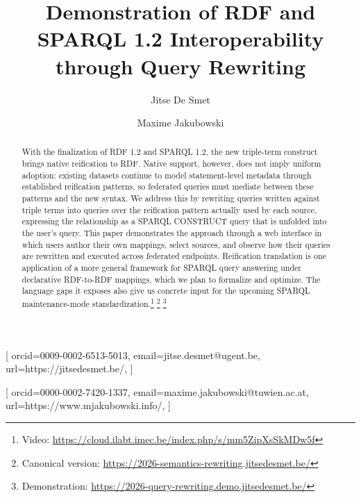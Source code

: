 \documentclass[
]{ceurart}
\begin{document}


\title{Demonstration of RDF and SPARQL 1.2 Interoperability through
  Query Rewriting}

\author[1]{Jitse De Smet}[%
orcid=0009-0002-6513-5013,
email=jitse.desmet@ugent.be,
url=https://jitsedesmet.be/,
]
\author[2]{Maxime Jakubowski}[%
orcid=0000-0002-7420-1337,
email=maxime.jakubowski@tuwien.ac.at,
url=https://www.mjakubowski.info/,
]
\address[1]{IDLab, Department of Electronics and Information Systems,
  Ghent University -- imec, Belgium}
\address[2]{TU Wien, Austria}

\begin{abstract}
  With the finalization of RDF 1.2 and SPARQL 1.2, the new triple-term
  construct brings native reification to RDF. Native support, however,
  does not imply uniform adoption: existing datasets continue to model
  statement-level metadata through established reification patterns,
  so federated queries must mediate between these patterns and the new
  syntax. We address this by rewriting queries written against triple
  terms into queries over the reification pattern actually used by
  each source, expressing the relationship as a SPARQL CONSTRUCT query
  that is unfolded into the user's query. This paper demonstrates the
  approach through a web interface in which users author their own
  mappings, select sources, and observe how their queries are
  rewritten and executed across federated endpoints.
  Reification translation is one application of a more general
  framework for SPARQL query answering under declarative RDF-to-RDF
  mappings, which we plan to formalize and optimize. The language gaps
  it exposes also give us concrete input for the upcoming SPARQL
  maintenance-mode standardization.\footnote{Video:
    \url{https://cloud.ilabt.imec.be/index.php/s/mm5ZipXsSkMDw5f}}
  \footnote{Canonical version:
    \url{https://2026-semantics-rewriting.jitsedesmet.be/}}
  \footnote{Demonstration:
    \url{https://2026-query-rewriting.demo.jitsedesmet.be/}}
\end{abstract}
\end{document}
